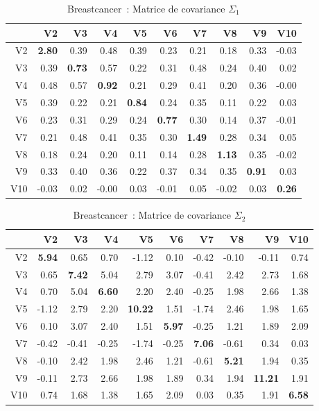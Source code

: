 \documentclass[a4paper,10pt]{report}
\begin{document}
\begin{table}[H]
	\centering
	\begin{tabular}{r|rrrrrrrrr}
		& V2 & V3 & V4 & V5 & V6 & V7 & V8 & V9 & V10 \\ 
		\hline
		V2 & \textbf{2.80} & 0.39 & 0.48 & 0.39 & 0.23 & 0.21 & 0.18 & 0.33 & -0.03 \\ 
		V3 & 0.39 & \textbf{0.73} & 0.57 & 0.22 & 0.31 & 0.48 & 0.24 & 0.40 & 0.02 \\ 
		V4 & 0.48 & 0.57 & \textbf{0.92} & 0.21 & 0.29 & 0.41 & 0.20 & 0.36 & -0.00 \\ 
		V5 & 0.39 & 0.22 & 0.21 & \textbf{0.84} & 0.24 & 0.35 & 0.11 & 0.22 & 0.03 \\ 
		V6 & 0.23 & 0.31 & 0.29 & 0.24 & \textbf{0.77} & 0.30 & 0.14 & 0.37 & -0.01 \\ 
		V7 & 0.21 & 0.48 & 0.41 & 0.35 & 0.30 & \textbf{1.49} & 0.28 & 0.34 & 0.05 \\ 
		V8 & 0.18 & 0.24 & 0.20 & 0.11 & 0.14 & 0.28 & \textbf{1.13} & 0.35 & -0.02 \\ 
		V9 & 0.33 & 0.40 & 0.36 & 0.22 & 0.37 & 0.34 & 0.35 & \textbf{0.91} & 0.03 \\ 
		V10 & -0.03 & 0.02 & -0.00 & 0.03 & -0.01 & 0.05 & -0.02 & 0.03 & \textbf{0.26} \\ 
	\end{tabular}
	\caption{Breastcancer~: Matrice de covariance $\Sigma_{1}$}
\end{table}

\begin{table}[H]
	\centering
	\begin{tabular}{r|rrrrrrrrr}
		& V2 & V3 & V4 & V5 & V6 & V7 & V8 & V9 & V10 \\ 
		\hline
		V2 & \textbf{5.94} & 0.65 & 0.70 & -1.12 & 0.10 & -0.42 & -0.10 & -0.11 & 0.74 \\ 
		V3 & 0.65 & \textbf{7.42} & 5.04 & 2.79 & 3.07 & -0.41 & 2.42 & 2.73 & 1.68 \\ 
		V4 & 0.70 & 5.04 & \textbf{6.60} & 2.20 & 2.40 & -0.25 & 1.98 & 2.66 & 1.38 \\ 
		V5 & -1.12 & 2.79 & 2.20 & \textbf{10.22} & 1.51 & -1.74 & 2.46 & 1.98 & 1.65 \\ 
		V6 & 0.10 & 3.07 & 2.40 & 1.51 & \textbf{5.97} & -0.25 & 1.21 & 1.89 & 2.09 \\ 
		V7 & -0.42 & -0.41 & -0.25 & -1.74 & -0.25 & \textbf{7.06} & -0.61 & 0.34 & 0.03 \\ 
		V8 & -0.10 & 2.42 & 1.98 & 2.46 & 1.21 & -0.61 & \textbf{5.21} & 1.94 & 0.35 \\ 
		V9 & -0.11 & 2.73 & 2.66 & 1.98 & 1.89 & 0.34 & 1.94 & \textbf{11.21} & 1.91 \\ 
		V10 & 0.74 & 1.68 & 1.38 & 1.65 & 2.09 & 0.03 & 0.35 & 1.91 & \textbf{6.58} \\ 
	\end{tabular}
	\caption{Breastcancer~: Matrice de covariance $\Sigma_{2}$}
\end{table}
\end{document}
